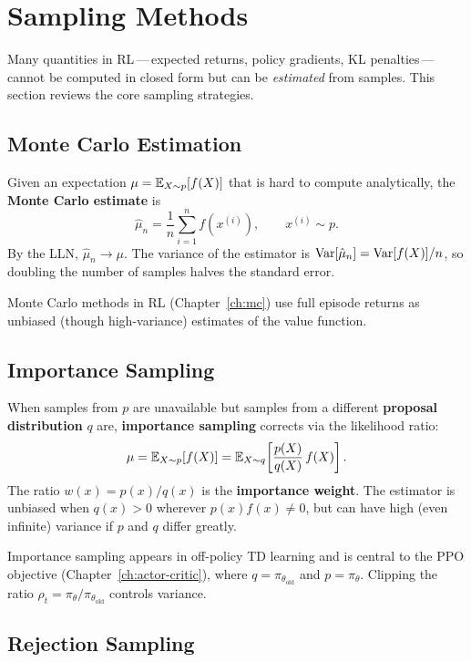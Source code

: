 \section{Sampling Methods}
\label{app:sampling}

Many quantities in RL\,---\,expected returns, policy gradients, KL
penalties\,---\,cannot be computed in closed form but can be \emph{estimated}
from samples.  This section reviews the core sampling strategies.

\subsection*{Monte Carlo Estimation}

Given an expectation $\mu = \operatorname{\mathbb{E}}_{X \sim p}[f(X)]$ that is hard to compute
analytically, the \textbf{Monte Carlo estimate} is
\[
    \hat{\mu}_n = \frac{1}{n}\sum_{i=1}^n f(x^{(i)}), \qquad
    x^{(i)} \sim p.
\]
By the LLN, $\hat{\mu}_n \to \mu$.  The variance of the estimator is
$\operatorname{Var}[\hat{\mu}_n] = \operatorname{Var}[f(X)] / n$, so doubling the number of samples
halves the standard error.

Monte Carlo methods in RL (Chapter~\ref{ch:mc}) use full episode returns
as unbiased (though high-variance) estimates of the value function.

\subsection*{Importance Sampling}

When samples from $p$ are unavailable but samples from a different
\textbf{proposal distribution} $q$ are, \textbf{importance sampling}
 corrects via the likelihood ratio:
\[
    \mu = \operatorname{\mathbb{E}}_{X \sim p}[f(X)]
        = \operatorname{\mathbb{E}}_{X \sim q}\!\left[\frac{p(X)}{q(X)}\,f(X)\right].
\]
The ratio $w(x) = p(x)/q(x)$ is the \textbf{importance weight}.  The
estimator is unbiased when $q(x) > 0$ wherever $p(x)f(x) \neq 0$, but
can have high (even infinite) variance if $p$ and $q$ differ greatly.

Importance sampling appears in off-policy TD learning and is central to
the PPO objective (Chapter~\ref{ch:actor-critic}), where
$q = \pi_{\theta_{\text{old}}}$ and $p = \pi_\theta$.  Clipping the ratio
$\rho_t = \pi_\theta / \pi_{\theta_{\text{old}}}$ controls variance.

\subsection*{Rejection Sampling}

